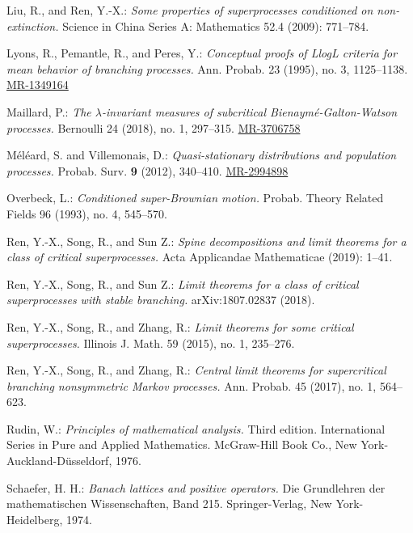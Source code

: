 \documentclass[12pt,a4paper]{amsart}
\numberwithin{equation}{section}
\theoremstyle{plain}
\theoremstyle{definition}
\theoremstyle{remark}
\def\MR#1{\href{http://www.ams.org/mathscinet-getitem?mr=#1}{MR-#1}}
\begin{document}
\begin{thebibliography}{99}
	Liu, R., and Ren, Y.-X.:
	\emph{Some properties of superprocesses conditioned on non-extinction.}
	Science in China Series A: Mathematics 52.4 (2009): 771--784.
	
	Lyons, R., Pemantle, R., and Peres, Y.:
	\emph{Conceptual proofs of LlogL criteria for mean behavior of branching processes.}
	Ann. Probab. 23 (1995), no. 3, 1125--1138.
	\MR{1349164}
	
	Maillard, P.:
	\emph{The $\lambda$-invariant measures of subcritical Bienaym\'e-Galton-Watson processes.}
	Bernoulli 24 (2018), no. 1, 297--315.
	\MR{3706758}

	M\'el\'eard, S. and Villemonais, D.:
	\emph{Quasi-stationary distributions and population processes.}
	Probab. Surv. \textbf{9} (2012), 
	340--410.
	\MR{2994898}
	
	Overbeck, L.:
	\emph{Conditioned super-Brownian motion.}
	Probab. Theory Related Fields 96 (1993), no. 4, 
	545--570.
	
	Ren, Y.-X., Song, R., and Sun Z.:
	\emph{Spine decompositions and limit theorems for a class of critical superprocesses.}
	Acta Applicandae Mathematicae (2019): 1--41.
	
	Ren, Y.-X., Song, R., and Sun Z.:
	\emph{Limit theorems for a class of critical superprocesses with stable branching.}
	arXiv:1807.02837 (2018).
	

	Ren, Y.-X., Song, R., and Zhang, R.:
	\emph{Limit theorems for some critical superprocesses.}
	Illinois J. Math. 59 (2015), no. 1, 235--276.

	Ren, Y.-X., Song, R., and Zhang, R.:
	\emph{Central limit theorems for supercritical branching nonsymmetric Markov processes.}
	Ann. Probab. 45 (2017), no. 1, 564--623.
	
	Rudin, W.:
	\emph{Principles of mathematical analysis.}
	Third edition. International Series in Pure and Applied Mathematics. McGraw-Hill Book Co., New York-Auckland-D\"usseldorf, 1976.

	Schaefer, H. H.:
	\emph{Banach lattices and positive operators.}
	Die Grundlehren der mathematischen Wissenschaften, Band 215. Springer-Verlag, New York-Heidelberg, 1974.
	

\end{thebibliography}
\end{document}
